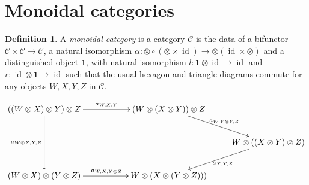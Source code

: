 \documentclass[11pt]{book}
\theoremstyle{Rem}
\theoremstyle{definition}
\newtheorem{Def}[theorem]{Definition}
\numberwithin{equation}{section}
\newcommand\id{\operatorname{id}}
\newcommand\ot{\otimes}
\newcommand\C{\mathcal C}
\newcommand\one{\mathbf{1}}
\begin{document}
\section{Monoidal categories}
\begin{Def}
A \textit{monoidal category} is a category $\C$ is the data of a bifunctor $\C \times \C\rightarrow \C $, a natural isomorphism $\alpha: \otimes \circ( \otimes \times \id) \rightarrow \otimes (\id \times \otimes)$ and a distinguished object $\one$, with natural isomorphism $l: \one\ot \id \rightarrow \id$ and $r:\id \ot \one \rightarrow \id$ such that the usual hexagon and triangle diagrams commute for any objects $W, X, Y, Z$ in $\mathcal{C}$.
\end{Def}
\begin{equation}\label{pentagon}
\xymatrix{
  	((W\otimes X)\otimes Y)\otimes  Z\ar[dd]_{a_{W\otimes X,Y,Z}}\ar[rr]^{a_{W,X,Y}} && (W\otimes(X\otimes Y))\otimes Z\ar[dr]^{a_{W,Y			\otimes Y,Z}}\\
   	& & & W\otimes((X\otimes Y)\otimes Z)\ar[dl]^{a_{X,Y,Z}}\\
  	(W\otimes X)\otimes(Y\otimes Z)\ar[rr]^{a_{W,X,Y\otimes Z}} && W\otimes(X\otimes (Y\otimes Z)))
 	}
\end{equation}
\end{document}
